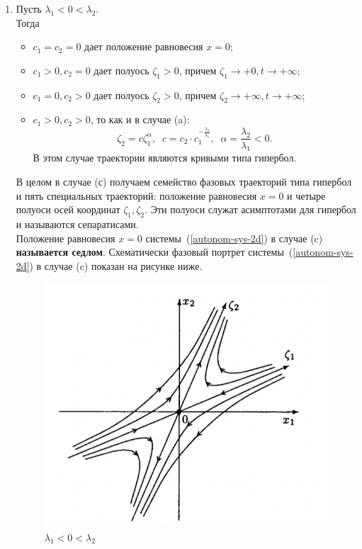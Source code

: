 \begin{enumerate}
\begin{enumerate}
    \item Пусть \(\lambda_1 < 0 < \lambda_2\).\\
        Тогда 
        \begin{itemize}
        \item $c_1 = c_2 = 0$ дает положение равновесия $x = 0$;
        \item $c_1 >0, c_2 = 0$ дает полуось $\zeta_1 > 0$, причем $\zeta_1 \longrightarrow +0, t \longrightarrow +\infty$;
        \item $c_1 = 0, c_2 > 0$ дает полуось $\zeta_2 > 0$, причем $\zeta_2 \longrightarrow +\infty, t \longrightarrow +\infty$;
        \item $c_1 > 0, c_2 > 0$, то как и в случае (a):
        \[\zeta_2 = c \zeta_1^{\alpha}, \;\; c = c_2 \cdot c_1^{-\frac{\lambda_2}{\lambda_1}}, \;\; \alpha = \frac{\lambda_2}{\lambda_1} < 0.\]
        В этом случае траектории являются кривыми типа гипербол.
        \end{itemize}
        В целом в случае (с) получаем семейство фазовых траекторий типа гипербол и пять специальных траекторий: положение равновесия $x = 0$ и четыре полуоси осей координат $\zeta_1, \zeta_2$. Эти полуоси служат асимптотами для гипербол и называются сепаратисами.\\
        Положение равновесия $x = 0$ системы~(\ref{autonom-sys-2d}) в случае (c) \textbf{называется седлом}. Схематически фазовый портрет системы~(\ref{autonom-sys-2d}) в случае (c) показан на рисунке ниже.
        \begin{figure}[H]\label{autonom-casec}
            \centering
            \includegraphics[scale=0.8]{sections/Sasha/images/autonom-casec.png}
            \caption{$\lambda_1 < 0 < \lambda_2$}
        \end{figure}
    

\end{enumerate}
\end{enumerate}
